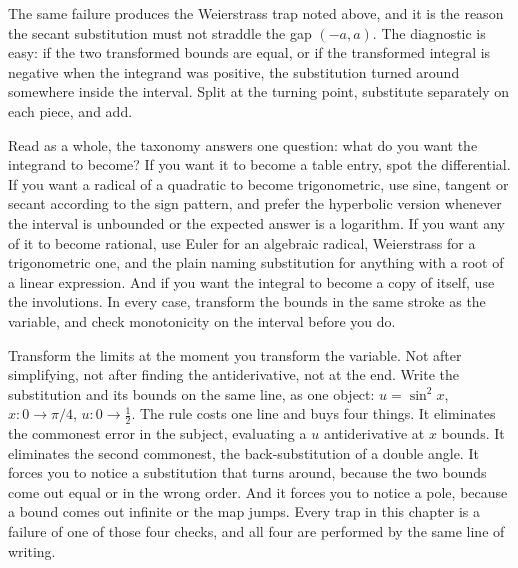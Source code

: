 The same failure produces the Weierstrass trap noted above, and it is the reason the secant substitution must not straddle the gap $(-a,a)$. The diagnostic is easy: if the two transformed bounds are equal, or if the transformed integral is negative when the integrand was positive, the substitution turned around somewhere inside the interval. Split at the turning point, substitute separately on each piece, and add.

Read as a whole, the taxonomy answers one question: what do you want the integrand to become? If you want it to become a table entry, spot the differential. If you want a radical of a quadratic to become trigonometric, use sine, tangent or secant according to the sign pattern, and prefer the hyperbolic version whenever the interval is unbounded or the expected answer is a logarithm. If you want any of it to become rational, use Euler for an algebraic radical, Weierstrass for a trigonometric one, and the plain naming substitution for anything with a root of a linear expression. And if you want the integral to become a copy of itself, use the involutions. In every case, transform the bounds in the same stroke as the variable, and check monotonicity on the interval before you do.

\begin{keynote}
Transform the limits at the moment you transform the variable. Not after simplifying, not after finding the antiderivative, not at the end. Write the substitution and its bounds on the same line, as one object: $u=\sin^2x$, $x:0\to\pi/4$, $u:0\to\tfrac12$. The rule costs one line and buys four things. It eliminates the commonest error in the subject, evaluating a $u$ antiderivative at $x$ bounds. It eliminates the second commonest, the back-substitution of a double angle. It forces you to notice a substitution that turns around, because the two bounds come out equal or in the wrong order. And it forces you to notice a pole, because a bound comes out infinite or the map jumps. Every trap in this chapter is a failure of one of those four checks, and all four are performed by the same line of writing.
\end{keynote}

